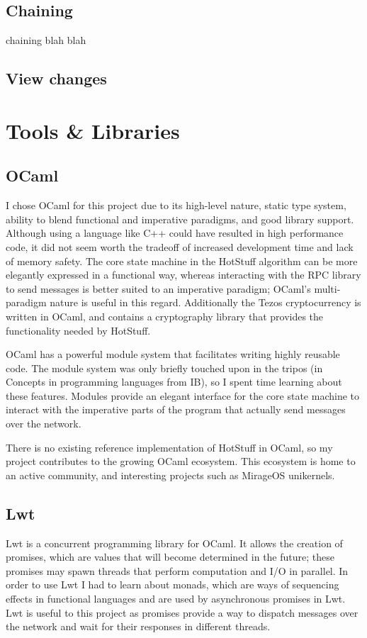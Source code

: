 \subsection{Chaining}
chaining blah blah
\subsection{View changes}
\section{Tools \& Libraries}
\subsection{OCaml}
I chose OCaml for this project due to its high-level nature, static type system, ability to blend functional and imperative paradigms, and good library support. Although using a language like C++ could have resulted in high performance code, it did not seem worth the tradeoff of increased development time and lack of memory safety. The core state machine in the HotStuff algorithm can be more elegantly expressed in a functional way, whereas interacting with the RPC library to send messages is better suited to an imperative paradigm; OCaml's multi-paradigm nature is useful in this regard. Additionally the Tezos cryptocurrency is written in OCaml, and contains a cryptography library that provides the functionality needed by HotStuff.

OCaml has a powerful module system that facilitates writing highly reusable code. The module system was only briefly touched upon in the tripos (in Concepts in programming languages from IB), so I spent time learning about these features. Modules provide an elegant interface for the core state machine to interact with the imperative parts of the program that actually send messages over the network.

There is no existing reference implementation of HotStuff in OCaml, so my project contributes to the growing OCaml ecosystem. This ecosystem is home to an active community, and interesting projects such as MirageOS unikernels.

\subsection{Lwt}
Lwt is a concurrent programming library for OCaml. It allows the creation of promises, which are values that will become determined in the future; these promises may spawn threads that perform computation and I/O in parallel. In order to use Lwt I had to learn about monads, which are ways of sequencing effects in functional languages and are used by asynchronous promises in Lwt. Lwt is useful to this project as promises provide a way to dispatch messages over the network and wait for their responses in different threads.

